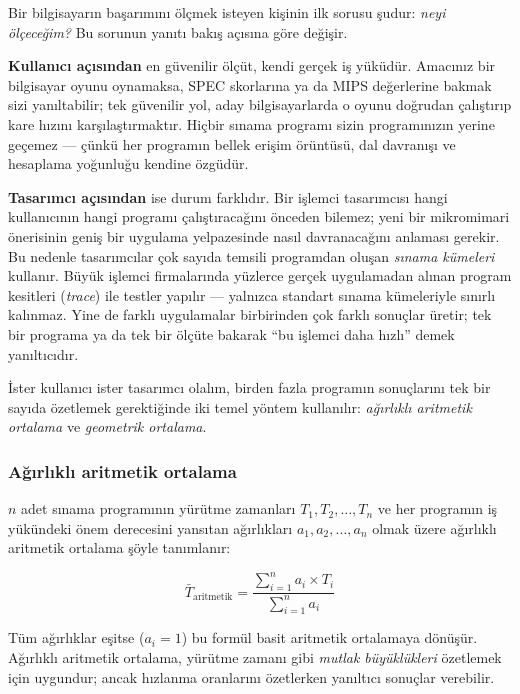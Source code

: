 Bir bilgisayarın başarımını ölçmek isteyen kişinin ilk sorusu şudur: \emph{neyi ölçeceğim?} Bu sorunun yanıtı bakış açısına göre değişir.

\textbf{Kullanıcı açısından} en güvenilir ölçüt, kendi gerçek iş yüküdür. Amacınız bir bilgisayar oyunu oynamaksa, SPEC skorlarına ya da MIPS değerlerine bakmak sizi yanıltabilir; tek güvenilir yol, aday bilgisayarlarda o oyunu doğrudan çalıştırıp kare hızını karşılaştırmaktır. Hiçbir sınama programı sizin programınızın yerine geçemez --- çünkü her programın bellek erişim örüntüsü, dal davranışı ve hesaplama yoğunluğu kendine özgüdür.

\textbf{Tasarımcı açısından} ise durum farklıdır. Bir işlemci tasarımcısı hangi kullanıcının hangi programı çalıştıracağını önceden bilemez; yeni bir mikromimari önerisinin geniş bir uygulama yelpazesinde nasıl davranacağını anlaması gerekir. Bu nedenle tasarımcılar çok sayıda temsili programdan oluşan \emph{sınama kümeleri} kullanır. Büyük işlemci firmalarında yüzlerce gerçek uygulamadan alınan program kesitleri (\emph{trace}) ile testler yapılır --- yalnızca standart sınama kümeleriyle sınırlı kalınmaz. Yine de farklı uygulamalar birbirinden çok farklı sonuçlar üretir; tek bir programa ya da tek bir ölçüte bakarak ``bu işlemci daha hızlı'' demek yanıltıcıdır.

İster kullanıcı ister tasarımcı olalım, birden fazla programın sonuçlarını tek bir sayıda özetlemek gerektiğinde iki temel yöntem kullanılır: \emph{ağırlıklı aritmetik ortalama} ve \emph{geometrik ortalama}.

\subsubsection*{Ağırlıklı aritmetik ortalama}

$n$ adet sınama programının yürütme zamanları $T_1, T_2, \ldots, T_n$ ve her programın iş yükündeki önem derecesini yansıtan ağırlıkları $a_1, a_2, \ldots, a_n$ olmak üzere ağırlıklı aritmetik ortalama şöyle tanımlanır:

\begin{equation}
\bar{T}_{\text{aritmetik}} = \frac{\sum_{i=1}^{n} a_i \times T_i}{\sum_{i=1}^{n} a_i}
\label{eq:agirlikli-ort}
\end{equation}

Tüm ağırlıklar eşitse ($a_i = 1$) bu formül basit aritmetik ortalamaya dönüşür. Ağırlıklı aritmetik ortalama, yürütme zamanı gibi \emph{mutlak büyüklükleri} özetlemek için uygundur; ancak hızlanma oranlarını özetlerken yanıltıcı sonuçlar verebilir.


